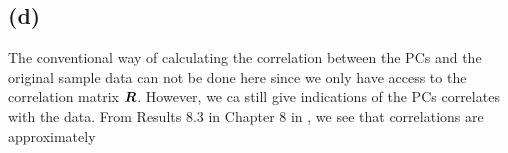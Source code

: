 \subsection*{(d)}
\label{sec:d-3}

The conventional way of calculating the correlation between the PCs and
the original sample data can not be done here since we only have access
to the correlation matrix $\bm{R}$. However, we ca still give indications
of the PCs correlates with the data. From Results 8.3 in Chapter 8 in
\cite[p.433]{book}, we see that correlations are approximately
\begin{comment}
\begin{equation*}
  \begin{pmatrix}
    0.09 &0.02 &-0.04 &0.04 &-0.10 &3.63 \\ 
    0.21 &0.21 &0.04 &-0.15 &-0.00 &3.06 \\ 
    -0.31 &0.09 &0.21 &0.40 &-0.02 &2.79 \\ 
    0.12 &0.16 &-0.04 &-0.08 &-0.09 &3.48 \\ 
    0.10 &0.06 &0.02 &-0.11 &-0.11 &3.47 \\ 
    0.10 &0.03 &-0.04 &-0.12 &-0.09 &3.62 \\ 
    0.16 &0.23 &-0.03 &-0.10 &0.51 &2.56 \\ 
    0.03 &0.07 &0.26 &-0.07 &-0.32 &3.43 \\ 
    -0.05 &-0.16 &0.33 &-0.37 &0.06 &3.01 \\ 
    0.00 &-0.01 &-0.05 &-0.11 &-0.23 &3.50 \\ 
    -0.15 &0.08 &-0.09 &-0.20 &-0.01 &3.54 \\ 
    0.26 &-0.13 &-0.10 &0.21 &-0.19 &2.82 \\ 
    0.06 &-0.10 &-0.10 &0.23 &-0.12 &3.15 \\ 
    0.11 &-0.06 &-0.12 &0.23 &-0.06 &3.33 \\ 
    -0.19 &-0.24 &-0.43 &-0.44 &0.29 &2.30 \\ 
    -0.08 &0.09 &-0.22 &0.40 &0.35 &2.52 \\ 
    -0.05 &0.03 &-0.04 &0.18 &0.37 &2.96 \\ 
    -0.17 &-0.34 &0.10 &0.06 &-0.18 &2.79 \\ 
    -0.15 &-0.22 &-0.09 &0.09 &-0.14 &3.31 \\ 
    -0.37 &0.34 &0.10 &-0.09 &0.04 &2.51 \\ 
    0.14 &-0.28 &0.38 &0.05 &0.64 &1.88  
  \end{pmatrix}.
\end{equation*}
\end{comment}
